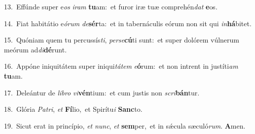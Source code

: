 {\numbfont\textcolor{\numbcolor}{13.}}~Effúnde super e\textit{os} \textit{i}\-\textit{ram} \textbf{tu}\-am:~\star et furor iræ tuæ comprehén\textit{dat} \textbf{e}\-os.\par
{\numbfont\textcolor{\numbcolor}{14.}}~Fiat habitátio e\-\textit{ó}\-\textit{rum} \textit{de}\-\textbf{sér}ta:~\star et in tabernáculis eórum non sit qui \textit{in}\-\textbf{há}bitet.\par
{\numbfont\textcolor{\numbcolor}{15.}}~Quóniam quem tu percussís\-\textit{ti}\-, \textit{per}\-\textit{se}\textbf{cú}ti sunt:~\star et super dolórem vúlnerum meórum ad\-\textit{di}\-\textbf{dé}runt.\par
{\numbfont\textcolor{\numbcolor}{16.}}~Appóne iniquitátem super iniqui\-\textit{tá}\-\textit{tem} \textit{e}\-\textbf{ó}rum:~\star et non intrent in justíti\textit{am} \textbf{tu}\-am.\par
{\numbfont\textcolor{\numbcolor}{17.}}~Deleántur de \textit{li}\-\textit{bro} \textit{vi}\-\textbf{vén}tium:~\star et cum justis non \textit{scri}\-\textbf{bán}tur.\par
{\numbfont\textcolor{\numbcolor}{18.}}~Glória \textit{Pa}\-\textit{tri}, \textit{et} \textbf{Fí}\-lio,~\star et Spirítu\textit{i} \textbf{Sanc}\-to.\par
{\numbfont\textcolor{\numbcolor}{19.}}~Sicut erat in princípio, \textit{et} \textit{nunc}\-, \textit{et} \textbf{sem}\-per,~\star et in sǽcula sæculó\-\textit{rum}\-. \textbf{A}\-men.\par
